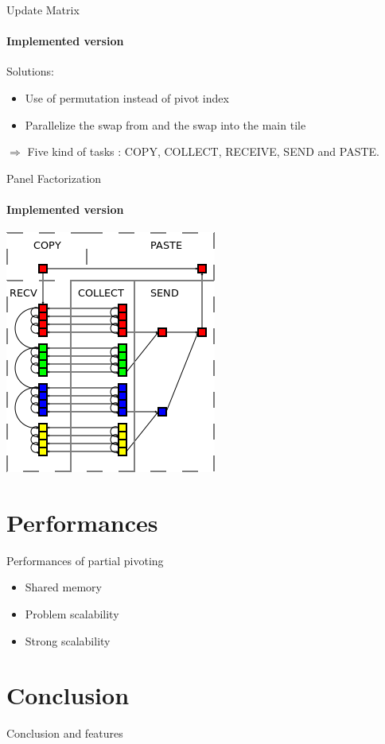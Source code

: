 \documentclass{beamer}
\begin{document}
\begin{frame}{Update Matrix}
\framesubtitle{Implemented version}
Solutions:
\begin{itemize}
\item Use of permutation instead of pivot index
\item Parallelize the swap from and the swap into the main tile
\end{itemize}
\pause
\begin{exampleblock}{}
$\Longrightarrow$ Five kind of tasks : COPY, COLLECT, RECEIVE, SEND and PASTE.
\end{exampleblock}{}

\end{frame}

\begin{frame}{Panel Factorization}
\framesubtitle{Implemented version}
\begin{center}
\includegraphics[scale=0.7]{swap_opt.png}
\end{center}
\end{frame}

\section{Performances}
\begin{frame}{Performances of partial pivoting}
\begin{itemize}
\item Shared memory
\item Problem scalability
\item Strong scalability
\end{itemize}
\end{frame}

\section*{Conclusion}
\begin{frame}{Conclusion and features}
\end{frame}
\end{document}
